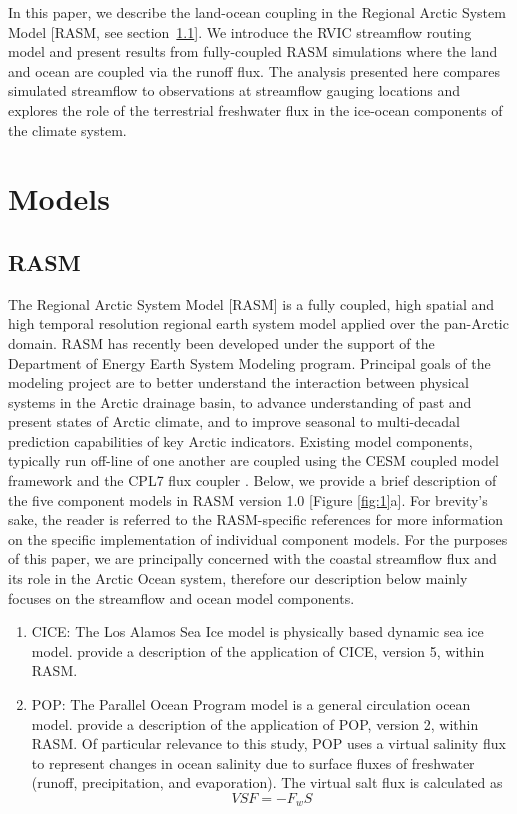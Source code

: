 \documentclass[jgrga, draft]{agutex}
\begin{document}
\begin{article}
In this paper, we describe the land-ocean coupling in the Regional Arctic System Model [RASM, see section~\ref{sec:rasm}].
We introduce the RVIC streamflow routing model and present results from fully-coupled RASM simulations where the land and ocean are coupled via the runoff flux.
The analysis presented here compares simulated streamflow to observations at streamflow gauging locations and explores the role of the terrestrial freshwater flux in the ice-ocean components of the climate system.

\section{Models}

\subsection{RASM}
\label{sec:rasm}

The Regional Arctic System Model [RASM] is a fully coupled, high spatial and high temporal resolution regional earth system model applied over the pan-Arctic domain.
RASM has recently been developed under the support of the Department of Energy Earth System Modeling program.
Principal goals of the modeling project are to better understand the interaction between physical systems in the Arctic drainage basin, to advance understanding of past and present states of Arctic climate, and to improve seasonal to multi-decadal prediction capabilities of key Arctic indicators.
Existing model components, typically run off-line of one another are coupled using the CESM coupled model framework and the CPL7 flux coupler \citep{Craig_2011}.
Below, we provide a brief description of the five component models in RASM version 1.0 [Figure \ref{fig:1}a].
For brevity's sake, the reader is referred to the RASM-specific references for more information on the specific implementation of individual component models.
For the purposes of this paper, we are principally concerned with the coastal streamflow flux and its role in the Arctic Ocean system, therefore our description below mainly focuses on the streamflow and ocean model components.

\begin{enumerate}
\item CICE: The Los Alamos Sea Ice model \citep{Hunke_2010} is physically based dynamic sea ice model.
\citet{Roberts_2015a} provide a description of the application of CICE, version 5, within RASM.
\item POP: The Parallel Ocean Program model \citep{Smith_2010} is a general circulation ocean model.
\citet{Roberts_2015a} provide a description of the application of POP, version 2, within RASM.
Of particular relevance to this study, POP uses a virtual salinity flux to represent changes in ocean salinity due to surface fluxes of freshwater (runoff, precipitation, and evaporation).
The virtual salt flux is calculated as
\begin{equation}
     VSF= -F_w S
\end{equation}


\end{enumerate}
\end{article}
\end{document}
